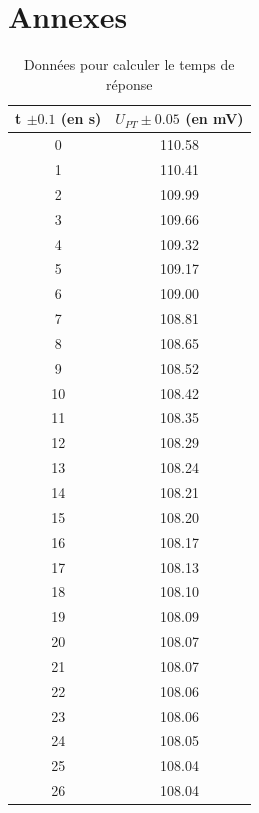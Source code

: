 \documentclass[12pt]{article}
\begin{document}
\section*{Annexes}
\begin{table}[!h]
	\begin{small}
	\begin{center}
		\begin{tabular}{|c|c|}
\hline
 t $\pm 0.1$ (en s) &  $U_{PT}\pm 0.05$ (en mV) \\
\hline

       0 &        110.58 \\
        1 &        110.41 \\
        2 &        109.99 \\
        3 &        109.66 \\
        4 &        109.32 \\
        5 &        109.17 \\
        6 &        109.00 \\
        7 &        108.81 \\
        8 &        108.65 \\
        9 &        108.52 \\
       10 &        108.42 \\
       11 &        108.35 \\
       12 &        108.29 \\
       13 &        108.24 \\
       14 &        108.21 \\
       15 &        108.20 \\
       16 &        108.17 \\
       17 &        108.13 \\
       18 &        108.10 \\
       19 &        108.09 \\
       20 &        108.07 \\
       21 &        108.07 \\
       22 &        108.06 \\
       23 &        108.06 \\
       24 &        108.05 \\
       25 &        108.04 \\
       26 &        108.04 \\

\hline
	\end{tabular}
	\end{center} \end{small}
	\label{Tableau_Data}
	\caption{Données pour calculer le temps de réponse}
\end{table}
\end{document}
